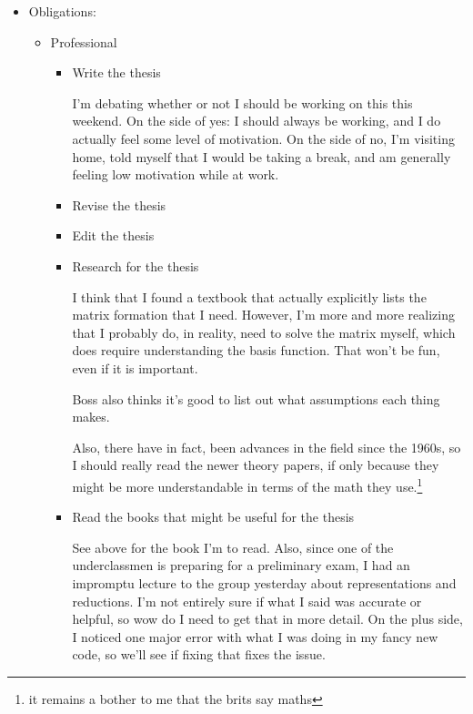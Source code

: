 \documentclass[12pt]{article}
\renewcommand{\,}{\textsuperscript{,}}
\begin{document}
\begin{itemize}

\item Obligations:

\begin{itemize}

\item Professional

\begin{itemize}

\item Write the thesis

I'm debating whether or not I should be working on this this weekend.  
On the side of yes: I should always be working, and I do actually feel some level of motivation.  
On the side of no, I'm visiting home, told myself that I would be taking a break, and am generally feeling low motivation while at work.

\item Revise the thesis

\item Edit the thesis

\item Research for the thesis

I think that I found a textbook that actually explicitly lists the matrix formation that I need.  
However, I'm more and more realizing that I probably do, in reality, need to solve the matrix myself, which does require understanding the basis function.  
That won't be fun, even if it is important.

Boss also thinks it's good to list out what assumptions each thing makes.

Also, there have in fact, been advances in the field since the 1960s, so I should really read the newer theory papers, if only because they might be more understandable in terms of the math they use.\footnote{it remains a bother to me that the brits say maths}

\item Read the books that might be useful for the thesis

See above for the book I'm to read.  
Also, since one of the underclassmen is preparing for a preliminary exam, I had an impromptu lecture to the group yesterday about representations and reductions.  
I'm not entirely sure if what I said was accurate or helpful, so wow do I need to get that in more detail.  
On the plus side, I noticed one major error with what I was doing in my fancy new code, so we'll see if fixing that fixes the issue.


\end{itemize}
\end{itemize}
\end{itemize}
\end{document}
